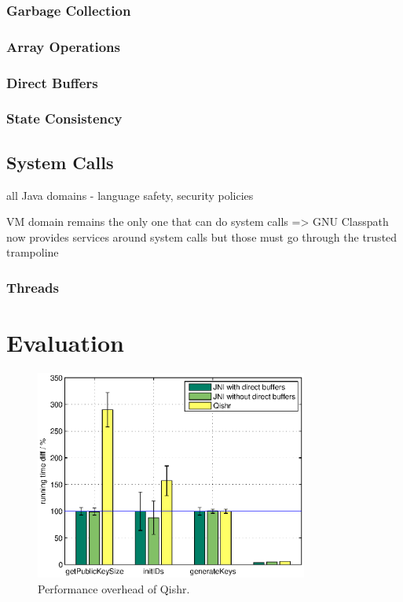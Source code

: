 \documentclass[a4paper,12pt,twoside,openright]{report}
\begin{document}
\subsection{Garbage Collection}

\subsection{Array Operations}

\subsection{Direct Buffers}
\label{sec:DirectBuffers}

\subsection{State Consistency}

\section{System Calls}

all Java domains - language safety, security policies

VM domain remains the only one that can do system calls => GNU Classpath now provides services around system calls but those must go through the trusted trampoline

\subsection{Threads}

\chapter{Evaluation} 


\begin{figure}
	\centering
	\includegraphics[width=0.8\textwidth]{chart_overhead.eps}
	\caption{Performance overhead of Qishr.}
\end{figure}
\end{document}
